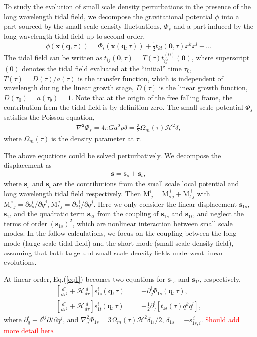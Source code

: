 \documentclass[aps,prd,twocolumn,showpacs,superscriptaddress,groupedaddress,nofootinbib]{revtex4}  %
\newcommand{\mr}{\mathrm}
\newcommand{\mb}{\mathbf}
\begin{document}
To study the evolution of small scale density perturbations  
in the presence of the long wavelength tidal field, we decompose the gravitational 
potential $\phi$  into a part sourced by the small scale density fluctuations, 
$\Phi_s$ and a part induced by the long wavelength tidal field up to second order,
\begin{eqnarray}
\label{eq4}
\phi(\bm{x}(\bm{q},\tau))=\Phi_s(\bm{x}(\bm{q},\tau))
+\frac{1}{2}t_{kl}(\bm{0}, \tau)x^k x^l + ...
\end{eqnarray}
The tidal field can be written as $t_{ij}(\bm{0}, \tau)=T(\tau)t_{ij}^{(0)}(\bm{0})$, 
where superscript  $(0)$ denotes the tidal field evaluated at the ``initial'' time $\tau_0$,
$T(\tau)=D(\tau)/a(\tau)$ is the transfer function, which is independent of wavelength 
during the linear growth stage,  $D(\tau)$ is the linear growth function, $D(\tau_0)=a(\tau_0)=1$.
Note that at the origin of the free falling frame, the contribution from the tidal 
field is by definition zero. The small scale potential $\Phi_s$ satisfies the Poisson equation,
\begin{eqnarray}
\label{eq5}
\nabla^2\Phi_s=4\pi Ga^2\bar{\rho}\delta=
\frac{3}{2}\Omega_m(\tau)\mathcal{H}^2\delta,
\end{eqnarray}
where $\Omega_m(\tau)$ is the density parameter at $\tau$.

The above equations could be solved perturbatively.
We decompose the displacement as
\begin{eqnarray}
\mb{s}=\mb{s}_s+\mb{s}_t,
\end{eqnarray}
where $\mb{s}_s$ and $\mb{s}_t$ are the contributions from the small scale local potential
and long wavelength tidal field respectively. Then 
$\mr{M}^i_{\ j}=\mr{M}^{\ i}_{s\ j}+\mr{M}^{\ i}_{t\ j}$ with
$\mr{M}^{\ i}_{s\ j}=\partial \mr{s}_s^i/\partial q^j$,
$\mr{M}^{\ i}_{t\ j}=\partial \mr{s}_t^i/\partial q^j$. 
Here we only consider
the linear displacement $\mb{s}_{1s}$, $\mb{s}_{1t}$ and the quadratic term 
$\mb{s}_{2t}$ from the coupling of $\mb{s}_{1s}$ and $\mb{s}_{1t}$, and neglect
the terms of order $(\mb{s}_{1s})^2$, which are 
nonlinear interaction between small scale modes.
In the follow calculations, we focus on the coupling between the long mode 
(large scale tidal field) and the short mode (small scale density field), 
assuming that both large and small scale density fields underwent linear evolutions.

At linear order, Eq.(\ref{eq1}) becomes two equations for 
$\mb{s}_{1s}$ and $\mb{s}_{1t}$, respectively,
\begin{eqnarray}
\left[\frac{d^2}{d\tau^2}+\mathcal{H}\frac{d}{d\tau}\right]\mr{s}_{1s}^i(\bm{q},\tau)&=&
-{\partial}_q^i\Phi_{1s}(\bm{q},\tau),\nonumber\\
\left[\frac{d^2}{d\tau^2}+
\mathcal{H}\frac{d}{d\tau}\right]\mr{s}_{1t}^i(\bm{q},\tau)&=&
-\frac{1}{2}{\partial}^i_q[t_{kl}(\tau)q^kq^l], 
\end{eqnarray}
where $\partial_q^i \equiv\delta^{ij}\partial/\partial q^j$, and 
$\nabla_q^2\Phi_{1s}=3\Omega_m(\tau)\mathcal{H}^2\delta_{1s}/2$,
$\delta_{1s}=-\mr{s}_{1s,i}^{\ i}$. \textcolor{red}{Should add more detail here.}
\end{document}
